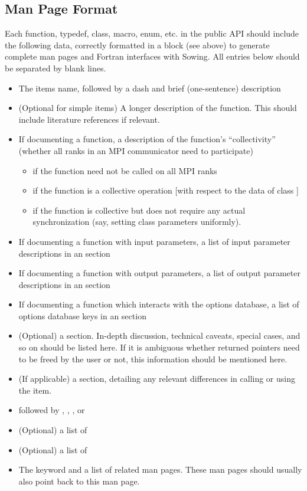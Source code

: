 \documentclass[twoside,12pt]{../sty/report_petsc}
\begin{document}
\subsection{Man Page Format}
Each function, typedef, class, macro, enum, etc. in the public API should include the following data, correctly formatted in 
a block (see above) to generate complete man pages and Fortran interfaces with Sowing. 
All entries below should be separated by blank lines.
\begin{itemize}
  \item The items name, followed by a dash and brief (one-sentence) description
  \item (Optional for simple items) A longer description of the function. This should include literature references if relevant.
  \item If documenting a function, a description of the function's ``collectivity'' (whether all ranks in an MPI communicator need to participate)
    \begin{itemize}
    \item {} if the function need not be called on all MPI ranks
    \item {} if the function is a collective operation [with respect to the data of class ]
    \item {} if the function is collective but does not require any actual synchronization (say, setting class parameters uniformly).
    \end{itemize}
  \item If documenting a function with input parameters, a list of input parameter descriptions in an  section
  \item If documenting a function with output parameters, a list of output parameter descriptions in an  section
  \item If documenting a function which interacts with the options database, a list of options database keys in an  section
  \item (Optional) a  section. In-depth discussion, technical caveats, special cases, and so on should be listed here. 
    If it is ambiguous whether returned pointers need to be freed by the user or not, this information should be mentioned here.
  \item (If applicable) a  section, detailing any relevant differences in calling or using the item.
  \item {} followed by , , , or 
  \item (Optional) a list of 
  \item (Optional) a list of 
  \item The  keyword and a list of related man pages. These man pages should usually also point back to this man page.
\end{itemize}
\end{document}
